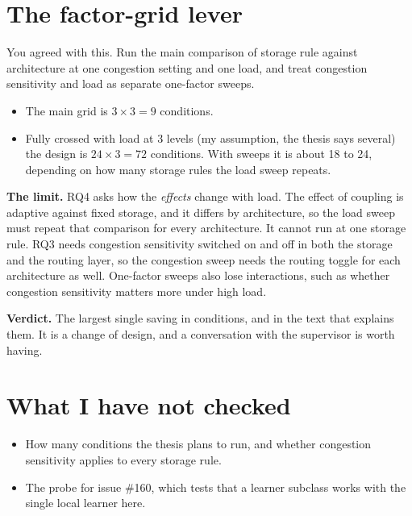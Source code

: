 \documentclass[11pt,a4paper]{article}
\begin{document}
\section{The factor-grid lever}\label{sec:grid}

You agreed with this. Run the main comparison of storage rule against architecture
at one congestion setting and one load, and treat congestion sensitivity and load
as separate one-factor sweeps.

\begin{itemize}[noitemsep]
  \item The main grid is $3 \times 3 = 9$ conditions.
  \item Fully crossed with load at 3 levels (my assumption, the thesis says
    several) the design is $24 \times 3 = 72$ conditions. With sweeps it is about
    18 to 24, depending on how many storage rules the load sweep repeats.
\end{itemize}

\textbf{The limit.} RQ4 asks how the \emph{effects} change with load. The effect of
coupling is adaptive against fixed storage, and it differs by architecture, so the
load sweep must repeat that comparison for every architecture. It cannot run at one
storage rule. RQ3 needs congestion sensitivity switched on and off in both the
storage and the routing layer, so the congestion sweep needs the routing toggle for
each architecture as well. One-factor sweeps also lose interactions, such as whether
congestion sensitivity matters more under high load.

\textbf{Verdict.} The largest single saving in conditions, and in the text that
explains them. It is a change of design, and a conversation with the supervisor is
worth having.

\section{What I have not checked}

\begin{itemize}[noitemsep]
  \item How many conditions the thesis plans to run, and whether congestion
    sensitivity applies to every storage rule.
  \item The probe for issue \#160, which tests that a learner subclass works with the
    single local learner here.
\end{itemize}
\end{document}
